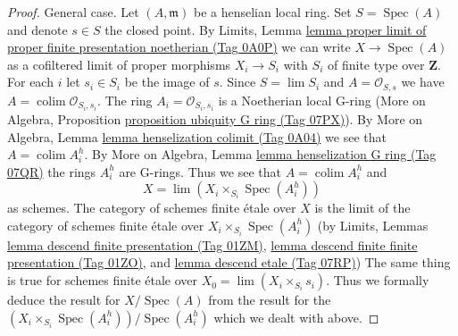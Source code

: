 \documentclass{amsart}
\theoremstyle{plain}
\theoremstyle{definition}
\theoremstyle{remark}
\numberwithin{equation}{subsection}
\def\lim{\mathop{\mathrm{lim}}\nolimits}
\def\colim{\mathop{\mathrm{colim}}\nolimits}
\def\Spec{\mathop{\mathrm{Spec}}}
\begin{document}
\begin{proof}
\medskip\noindent
General case. Let $(A, \mathfrak m)$ be a henselian local ring.
Set $S = \Spec(A)$ and denote $s \in S$ the closed point. By Limits, Lemma
\href{https://stacks.math.columbia.edu/tag/0A0P}{lemma proper limit of proper finite presentation noetherian (Tag 0A0P)}
we can write $X \to \Spec(A)$ as a cofiltered limit of
proper morphisms $X_i \to S_i$ with $S_i$ of finite type over $\mathbf{Z}$.
For each $i$ let $s_i \in S_i$ be the image of $s$.
Since $S = \lim S_i$ and $A = \mathcal{O}_{S, s}$ we have
$A = \colim \mathcal{O}_{S_i, s_i}$. The ring $A_i = \mathcal{O}_{S_i, s_i}$
is a Noetherian local G-ring (More on Algebra, Proposition
\href{https://stacks.math.columbia.edu/tag/07PX}{proposition ubiquity G ring (Tag 07PX)}).
By More on Algebra, Lemma \href{https://stacks.math.columbia.edu/tag/0A04}{lemma henselization colimit (Tag 0A04)}
we see that $A = \colim A_i^h$. By
More on Algebra, Lemma \href{https://stacks.math.columbia.edu/tag/07QR}{lemma henselization G ring (Tag 07QR)}
the rings $A_i^h$ are G-rings. Thus we see that $A = \colim A_i^h$ and
$$
X = \lim (X_i \times_{S_i} \Spec(A_i^h))
$$
as schemes. The category of schemes finite \'etale over $X$ is the limit
of the category of schemes finite \'etale over
$X_i \times_{S_i} \Spec(A_i^h)$ (by
Limits, Lemmas
\href{https://stacks.math.columbia.edu/tag/01ZM}{lemma descend finite presentation (Tag 01ZM)},
\href{https://stacks.math.columbia.edu/tag/01ZO}{lemma descend finite finite presentation (Tag 01ZO)}, and
\href{https://stacks.math.columbia.edu/tag/07RP}{lemma descend etale (Tag 07RP)})
The same thing is true for schemes finite \'etale over
$X_0 = \lim (X_i \times_{S_i} s_i)$.
Thus we formally deduce the result for $X / \Spec(A)$
from the result for the $(X_i \times_{S_i} \Spec(A_i^h)) / \Spec(A_i^h)$
which we dealt with above.
\end{proof}
\end{document}
